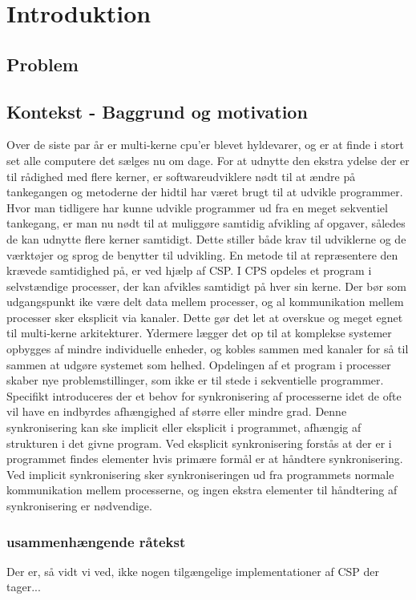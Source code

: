 \chapter{Introduktion}
  \section{Problem}	 
  \section{Kontekst - Baggrund og motivation}
Over de siste par år er multi-kerne cpu'er blevet hyldevarer, og er at finde i 
stort set alle computere det sælges nu om dage. For at udnytte den ekstra 
ydelse der er til rådighed med flere kerner, er softwareudviklere nødt til at 
ændre på tankegangen og metoderne der hidtil har været brugt til at udvikle 
programmer. Hvor man tidligere har kunne udvikle programmer ud fra en meget 
sekventiel tankegang, er man nu nødt til at muliggøre samtidig afvikling af 
opgaver, således de kan udnytte flere kerner samtidigt. Dette stiller både krav 
til udviklerne og de værktøjer og sprog de benytter til udvikling.  En metode 
til at repræsentere den krævede samtidighed på, er ved hjælp af 
CSP\cite{hoare-csp}.  I CPS opdeles et program i selvstændige processer, der 
kan afvikles samtidigt på hver sin kerne. Der bør som udgangspunkt ike være 
delt data mellem processer, og al kommunikation mellem processer sker eksplicit 
via kanaler. Dette gør det let at overskue og meget egnet til multi-kerne 
arkitekturer. Ydermere lægger det op til at komplekse systemer opbygges af 
mindre individuelle enheder, og kobles sammen med kanaler for så til sammen at 
udgøre systemet som helhed.
Opdelingen af et program i processer skaber nye problemstillinger, som ikke er 
til stede i sekventielle programmer. Specifikt introduceres der et behov for 
synkronisering af processerne idet de ofte vil have en indbyrdes afhængighed af 
større eller mindre grad. Denne synkronisering kan ske implicit eller eksplicit 
i programmet, afhængig af strukturen i det givne program. Ved eksplicit 
synkronisering forstås at der er i programmet findes elementer hvis primære 
formål er at håndtere synkronisering. Ved implicit synkronisering sker 
synkroniseringen ud fra programmets normale kommunikation mellem processerne, 
og ingen ekstra elementer til håndtering af synkronisering er nødvendige.  

\subsection{usammenhængende råtekst}
Der er, så vidt vi ved, ikke nogen tilgængelige implementationer af CSP der 
tager... 

